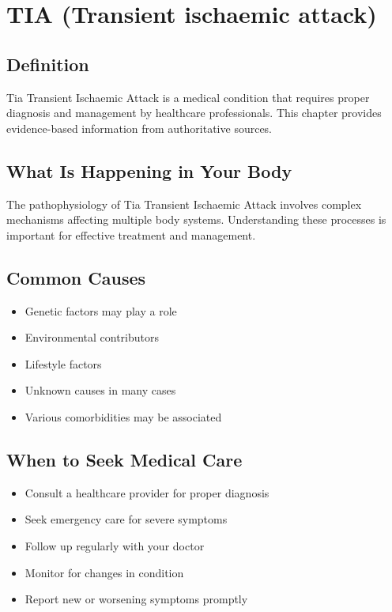 
\chapter{TIA (Transient ischaemic attack)}

\section*{Definition}
Tia Transient Ischaemic Attack is a medical condition that requires proper diagnosis and management by healthcare professionals. This chapter provides evidence-based information from authoritative sources.

\section*{What Is Happening in Your Body}
The pathophysiology of Tia Transient Ischaemic Attack involves complex mechanisms affecting multiple body systems. Understanding these processes is important for effective treatment and management.

\section*{Common Causes}
\begin{itemize}
  \item Genetic factors may play a role
  \item Environmental contributors
  \item Lifestyle factors
  \item Unknown causes in many cases
  \item Various comorbidities may be associated
\end{itemize}

\section*{When to Seek Medical Care}
\begin{itemize}
  \item Consult a healthcare provider for proper diagnosis
  \item Seek emergency care for severe symptoms
  \item Follow up regularly with your doctor
  \item Monitor for changes in condition
  \item Report new or worsening symptoms promptly
\end{itemize}

